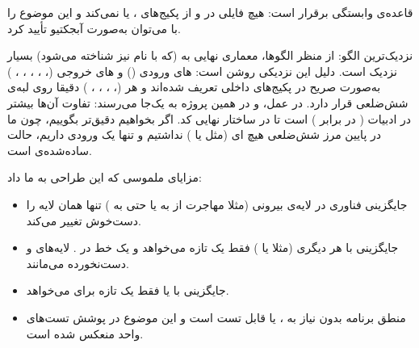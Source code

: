 {قاعده‌ی وابستگی برقرار است:} هیچ فایلی در  و  از پکیج‌های ،  یا   نمی‌کند و این موضوع را با  می‌توان به‌صورت آبجکتیو تأیید کرد.

{نزدیک‌ترین الگو:} از منظر الگوها، معماری نهایی به  (که با نام  نیز شناخته می‌شود) بسیار نزدیک است. دلیل این نزدیکی روشن است: های ورودی () و های خروجی (، ، ، ، ، ) به‌صورت صریح در پکیج‌های داخلی تعریف شده‌اند و هر  (، ، ، ، ) دقیقا روی لبه‌ی شش‌ضلعی قرار دارد. در عمل،  و  در همین پروژه به یک‌جا می‌رسند: تفاوت آن‌ها بیشتر در ادبیات ( در برابر ) است تا در ساختار نهایی کد. اگر بخواهیم دقیق‌تر بگوییم، چون ما در پایین مرز شش‌ضلعی هیچ ای (مثل  یا ) نداشتیم و تنها یک  ورودی داریم، حالت ساده‌شده‌ی  است.

{مزایای ملموسی که این طراحی به ما داد:}
\begin{itemize}
    \item جایگزینی فناوری در لایه‌ی بیرونی (مثلا مهاجرت از  به  یا حتی به ) تنها همان لایه را دست‌خوش تغییر می‌کند.
    \item جایگزینی  با هر  دیگری (مثلا  یا ) فقط یک  تازه می‌خواهد و یک خط در . لایه‌های  و  دست‌نخورده می‌مانند.
    \item جایگزینی  با  یا  فقط یک  تازه برای  می‌خواهد.
    \item منطق برنامه بدون نیاز به ،  یا  قابل تست است و این موضوع در پوشش تست‌های واحد منعکس شده است.
\end{itemize}


